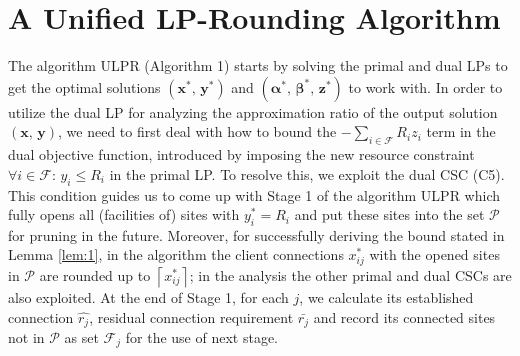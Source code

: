 \documentclass[10pt]{llncs}
\begin{document}
\section{A Unified LP-Rounding Algorithm}

The algorithm ULPR (Algorithm 1) starts by solving the primal and
dual LPs to get the optimal solutions $\left(\boldsymbol{x^{*}},\,\boldsymbol{y^{*}}\right)$
and $\left(\boldsymbol{\alpha^{*}},\,\boldsymbol{\beta^{*}},\,\boldsymbol{z^{*}}\right)$
to work with. In order to utilize the dual LP for analyzing the approximation
ratio of the output solution $\left(\boldsymbol{x},\,\boldsymbol{y}\right)$,
we need to first deal with how to bound the $-\sum_{i\in\mathcal{F}}R_{i}z_{i}$
term in the dual objective function, introduced by imposing the new
resource constraint $\forall i\in\mathcal{F}:\, y_{i}\leq R_{i}$
in the primal LP. To resolve this, we exploit the dual CSC (C5). This
condition guides us to come up with Stage 1 of the algorithm ULPR
which fully opens all (facilities of) sites with $y_{i}^{*}=R_{i}$
and put these sites into the set $\mathcal{P}$ for pruning in the
future. Moreover, for successfully deriving the bound stated in Lemma
\ref{lem:1}, in the algorithm the client connections $x_{ij}^{*}$
with the opened sites in $\mathcal{P}$ $ $are rounded up to $\left\lceil x_{ij}^{*}\right\rceil $;
in the analysis the other primal and dual CSCs are also exploited.
At the end of Stage 1, for each $j$, we calculate its established
connection $\hat{r_{j}}$, residual connection requirement $\bar{r_{j}}$
and record its connected sites not in $\mathcal{P}$ as set $\mathcal{F}_{j}$
for the use of next stage.
\end{document}
